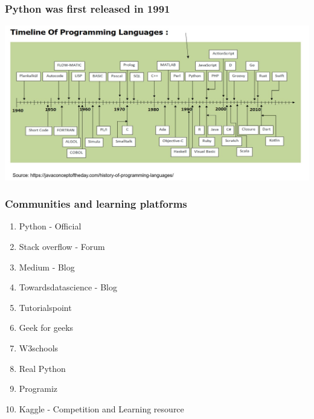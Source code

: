 \documentclass{beamer}
\begin{document}
\begin{frame}
    \frametitle{Python was first released in 1991}
    \centering
    \includegraphics[scale = 0.4]{figures/timeline_lang.jpg}
\end{frame}

\begin{frame}
    \frametitle{Communities and learning platforms}
    \begin{multicols}{2}
        \begin{enumerate}
            \item Python - Official
            \item Stack overflow - Forum
            \item Medium - Blog
            \item Towardsdatascience - Blog
            \item Tutorialspoint
            \item Geek for geeks
            \item W3schools
            \item Real Python
            \item Programiz
            \item Kaggle - Competition and Learning resource
        \end{enumerate}
    \end{multicols}
\end{frame}
\end{document}
